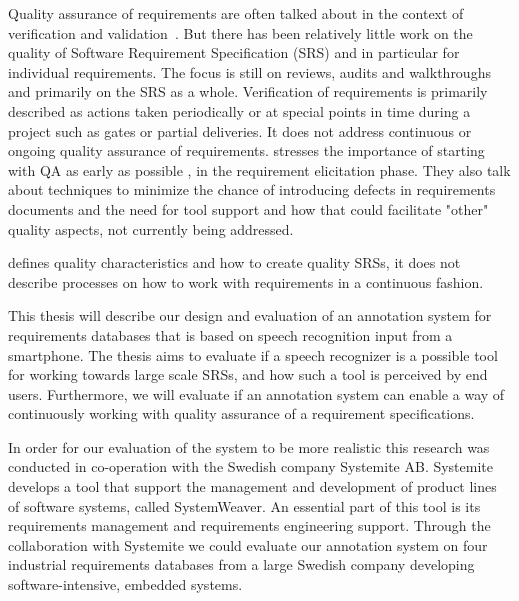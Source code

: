 Quality assurance of requirements are often talked about in the context of verification and validation~\citep{reqqa,qualitybook}. But there has been relatively little work on the quality of Software Requirement Specification (SRS) and in particular for individual requirements. The focus is still on reviews, audits and walkthroughs and primarily on the SRS as a whole. Verification of requirements is primarily described as actions taken periodically or at special points in time during a project such as gates or partial deliveries. It does not address continuous or ongoing quality assurance of requirements. \citet{reqqa} stresses the importance of starting with QA as early as possible , in the requirement elicitation phase. They also talk about techniques to minimize the chance of introducing defects in requirements documents and the need for tool support and how that could facilitate "other" quality aspects, not currently being addressed.

\citet{IEEE830} defines quality characteristics and how to create quality SRSs, it does not describe processes on how to work with requirements in a continuous fashion.

This thesis will describe our design and evaluation of an annotation system for requirements databases that is based on speech recognition input from a smartphone. The thesis aims to evaluate if a speech recognizer is a possible tool for working towards large scale SRSs, and how such a tool is perceived by end users. Furthermore, we will evaluate if an annotation system can enable a way of continuously working with quality assurance of a requirement specifications.

In order for our evaluation of the system to be more realistic this research was conducted in co-operation with the Swedish company Systemite AB. Systemite develops a tool that support the management and development of product lines of software systems, called SystemWeaver.
An essential part of this tool is its requirements management and requirements engineering support.
Through the collaboration with Systemite we could evaluate our annotation system on four industrial requirements databases from a large Swedish company developing software-intensive, embedded systems.

